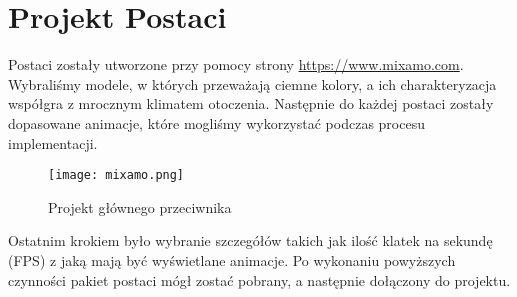 \section{Projekt Postaci}
Postaci zostały utworzone przy pomocy strony \url{https://www.mixamo.com}. Wybraliśmy modele, w których przeważają ciemne kolory, a ich charakteryzacja współgra z mrocznym klimatem otoczenia. 
Następnie do każdej postaci zostały dopasowane animacje, które mogliśmy wykorzystać podczas procesu implementacji.
\begin{figure}[H]
	\center
	\texttt{[image: mixamo.png]}
	\caption{Projekt głównego przeciwnika}
\end{figure}
Ostatnim krokiem było wybranie szczegółów takich jak ilość klatek na sekundę (FPS) z jaką mają być wyświetlane animacje. 
Po wykonaniu powyższych czynności pakiet postaci mógł zostać pobrany, a następnie dołączony do projektu. 